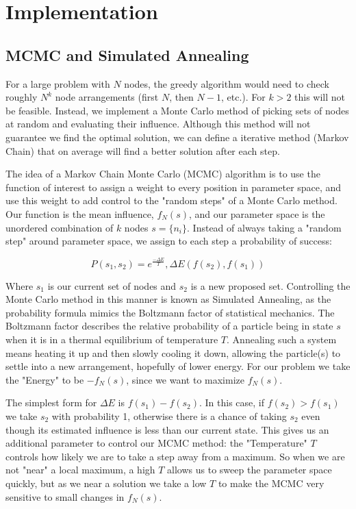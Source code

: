 \documentclass{article}
\begin{document}
		
	\section{Implementation}
	
	\subsection{MCMC and Simulated Annealing}
	For a large problem with $N$ nodes, the greedy algorithm would need to check roughly $N^k$ node arrangements (first $N$, then $N-1$, etc.). For $k > 2$ this will not be feasible. Instead, we implement a Monte Carlo method of picking sets of nodes at random and evaluating their influence. Although this method will not guarantee we find the optimal solution, we can define a iterative method (Markov Chain) that on average will find a better solution after each step.
		
	The idea of a Markov Chain Monte Carlo (MCMC) algorithm is to use the function of interest to assign a weight to every position in parameter space, and use this weight to add control to the "random steps" of a Monte Carlo method. Our function is the mean influence, $f_N(s)$, and our parameter space is the unordered combination of $k$ nodes $s = \{n_i\}$. Instead of always taking a "random step" around parameter space, we assign to each step a probability of success:
		
		\begin{equation}
		\boxed{
			P(s_1,s_2) = e^\frac{-\Delta E}{T}, \Delta E(f(s_2),f(s_1))
		}
		\end{equation}
		
		Where $s_1$ is our current set of nodes and $s_2$ is a new proposed set. Controlling the Monte Carlo method in this manner is known as Simulated Annealing, as the probability formula mimics the Boltzmann factor of statistical mechanics. The Boltzmann factor describes the relative probability of a particle being in state $s$ when it is in a thermal equilibrium of temperature $T$. Annealing such a system means heating it up and then slowly cooling it down, allowing the particle(s) to settle into a new arrangement, hopefully of lower energy. For our problem we take the "Energy" to be $-f_N(s)$, since we want to maximize $f_N(s)$. 
		
		The simplest form for $\Delta E$ is $f(s_1) - f(s_2)$. In this case, if $f(s_2) > f(s_1)$ we take $s_2$ with probability 1, otherwise there is a chance of taking $s_2$ even though its estimated influence is less than our current state. This gives us an additional parameter to control our MCMC method: the "Temperature" $T$ controls how likely we are to take a step away from a maximum. So when we are not "near" a local maximum, a high $T$ allows us to sweep the parameter space quickly, but as we near a solution we take a low $T$ to make the MCMC very sensitive to small changes in $f_N(s)$.
	
\end{document}
